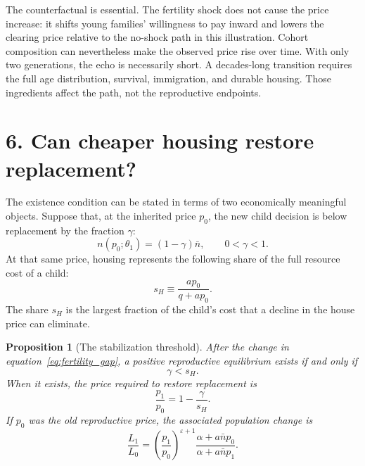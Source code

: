 \documentclass[11pt]{article}
\newtheorem{proposition}{Proposition}
\theoremstyle{definition}
\begin{document}
The counterfactual is essential. The fertility shock does not cause the price
increase: it shifts young families' willingness to pay inward and lowers the
clearing price relative to the no-shock path in this illustration. Cohort
composition can nevertheless make the observed price rise over time. With only
two generations, the echo is necessarily short. A decades-long transition
requires the full age distribution, survival, immigration, and durable
housing. Those ingredients affect the path, not the reproductive endpoints.

\section*{6. Can cheaper housing restore replacement?}

The existence condition can be stated in terms of two economically meaningful
objects. Suppose that, at the inherited price $p_0$, the new child decision is
below replacement by the fraction $\gamma$:
\begin{equation}
 n(p_0;\theta_1)=(1-\gamma)\bar n,
 \qquad 0<\gamma<1.
 \label{eq:fertility_gap}
\end{equation}
At that same price, housing represents the following share of the full resource
cost of a child:
\begin{equation}
 s_H\equiv\frac{ap_0}{q+ap_0}.
 \label{eq:housing_share}
\end{equation}
The share $s_H$ is the largest fraction of the child's cost that a decline in
the house price can eliminate.

\begin{proposition}[The stabilization threshold]
\label{prop:threshold}
After the change in equation~\eqref{eq:fertility_gap}, a positive reproductive
equilibrium exists if and only if
\begin{equation}
 \gamma<s_H.
 \label{eq:threshold}
\end{equation}
When it exists, the price required to restore replacement is
\begin{equation}
 \frac{p_1}{p_0}=1-\frac{\gamma}{s_H}.
 \label{eq:price_gap_formula}
\end{equation}
If $p_0$ was the old reproductive price, the associated population change is
\begin{equation}
 \frac{L_1}{L_0}
 =\left(\frac{p_1}{p_0}\right)^{\varepsilon+1}
 \frac{\alpha+a\bar n p_0}{\alpha+a\bar n p_1}.
 \label{eq:population_ratio}
\end{equation}
\end{proposition}
\end{document}
